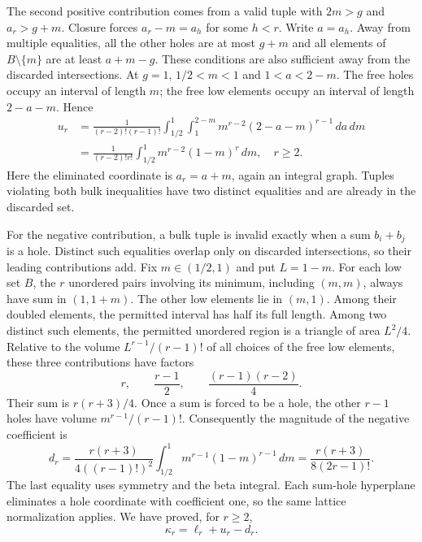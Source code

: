 \documentclass[11pt]{article}
\theoremstyle{remark}\newtheorem{remark}[theorem]{Remark}
\begin{document}
The second positive contribution comes from a valid tuple with $2m>g$
and $a_r>g+m$. Closure forces $a_r-m=a_h$ for some $h<r$. Write $a=a_h$.
Away from multiple equalities, all the other holes are at most $g+m$ and
all elements of $B\setminus\{m\}$ are at least $a+m-g$. These conditions
are also sufficient away from the discarded intersections. At $g=1$,
$1/2<m<1$ and $1<a<2-m$. The free holes occupy an interval of length
$m$; the free low elements occupy an interval of length $2-a-m$. Hence
\begin{equation}\label{eq:kappa-high}
\begin{split}
u_r&=\frac{1}{(r-2)!(r-1)!}
 \int_{1/2}^1\int_1^{2-m}m^{r-2}(2-a-m)^{r-1}\,da\,dm\\
&=\frac{1}{(r-2)!r!}\int_{1/2}^1m^{r-2}(1-m)^r\,dm,
\quad r\ge2.
\end{split}
\end{equation}
Here the eliminated coordinate is $a_r=a+m$, again an integral graph.
Tuples violating both bulk inequalities have two distinct equalities and
are already in the discarded set.

For the negative contribution, a bulk tuple is invalid exactly when a sum
$b_i+b_j$ is a hole. Distinct such equalities overlap only on discarded
intersections, so their leading contributions add. Fix $m\in(1/2,1)$ and
put $L=1-m$. For each low set $B$, the $r$ unordered pairs involving its
minimum, including $(m,m)$, always have sum in $(1,1+m)$. The other low
elements lie in $(m,1)$. Among their doubled elements, the permitted
interval has half its full length. Among two distinct such elements,
the permitted unordered region is a triangle of area $L^2/4$.
Relative to the volume $L^{r-1}/(r-1)!$ of all choices of the free low
elements, these three contributions have factors
\[
 r,\qquad \frac{r-1}{2},\qquad \frac{(r-1)(r-2)}4.
\]
Their sum is $r(r+3)/4$. Once a sum is forced to be a hole, the other
$r-1$ holes have volume $m^{r-1}/(r-1)!$. Consequently the magnitude of
the negative coefficient is
\begin{equation}\label{eq:kappa-negative}
d_r=\frac{r(r+3)}{4((r-1)!)^2}
 \int_{1/2}^1m^{r-1}(1-m)^{r-1}\,dm
=\frac{r(r+3)}{8(2r-1)!}.
\end{equation}
The last equality uses symmetry and the beta integral. Each sum-hole
hyperplane eliminates a hole coordinate with coefficient one, so the
same lattice normalization applies. We have proved, for $r\ge2$,
\begin{equation}\label{eq:kappa-split}
\kappa_r=\ell_r+u_r-d_r.
\end{equation}
\end{document}
